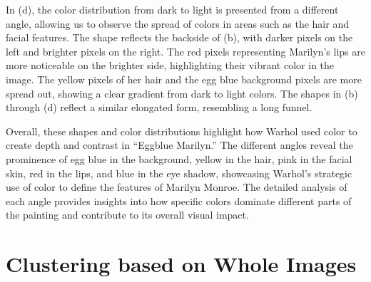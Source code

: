 \documentclass{article}
\begin{document}
In (d), the color distribution from dark to light is presented from a
different angle, allowing us to observe the spread of colors in areas
such as the hair and facial features. The shape reflects the backside of
(b), with darker pixels on the left and brighter pixels on the right.
The red pixels representing Marilyn's lips are more noticeable on the
brighter side, highlighting their vibrant color in the image. The yellow
pixels of her hair and the egg blue background pixels are more spread
out, showing a clear gradient from dark to light colors. The shapes in
(b) through (d) reflect a similar elongated form, resembling a long
funnel.

Overall, these shapes and color distributions highlight how Warhol used
color to create depth and contrast in ``Eggblue Marilyn.'' The different
angles reveal the prominence of egg blue in the background, yellow in
the hair, pink in the facial skin, red in the lips, and blue in the eye
shadow, showcasing Warhol's strategic use of color to define the
features of Marilyn Monroe. The detailed analysis of each angle provides
insights into how specific colors dominate different parts of the
painting and contribute to its overall visual impact.

\hypertarget{clustering-based-on-whole-images}{%
\section{Clustering based on Whole
Images}\label{clustering-based-on-whole-images}}
\end{document}
